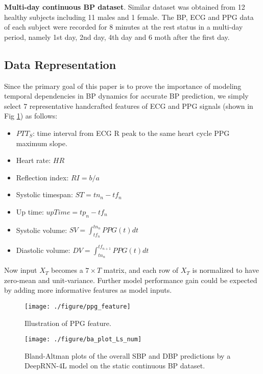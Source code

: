 \documentclass[letterpaper, 10 pt, conference]{ieeeconf}
\begin{document}
\textbf{Multi-day continuous BP dataset}.
Similar dataset was obtained from 12 healthy subjects including 11 males and 1 female.
The BP, ECG and PPG data of each subject were recorded for 8 minutes at the rest status in a multi-day period, namely 1st day, 2nd day, 4th day and 6 moth after the first day.


\subsection{Data Representation}
Since the primary goal of this paper is to prove the importance of modeling temporal dependencies in BP dynamics for accurate BP prediction, we simply select 7 representative handcrafted features of ECG and PPG signals (shown in Fig \ref{fig:PPG_feature}) as follows:
\begin{itemize}
\item $ PTT_S $: time interval from ECG R peak to the same heart cycle PPG maximum slope.
\item Heart rate: $ HR $
\item Reflection index: $ RI = b/a $ 
\item Systolic timespan: $ ST = tn_n - tf_n  $ 
\item Up time: $ upTime = tp_n - tf_n   $   
\item Systolic volume: $ SV = \int_{tf_n}^{tn_n} PPG(t) dt  $ 
\item Diastolic volume: $ DV = \int_{tn_n} ^ { tf_{n+1} } PPG(t) dt $ 
\end{itemize}

Now input $X_T$ becomes a $ 7 \times T$ matrix,
and each row of $X_T$ is normalized to have zero-mean and unit-variance. 
Further model performance gain could be expected by adding more informative features as model inputs.

\begin{figure}
\centering
\texttt{[image: ./figure/ppg\_feature]}
\caption{Illustration of PPG feature.}
\label{fig:PPG_feature}
\end{figure}

\begin{figure*}
\centering
\texttt{[image: ./figure/ba\_plot\_Ls\_num]}
\caption{Bland-Altman plots of the overall SBP and DBP predictions by a DeepRNN-4L model on the static continuous BP dataset.}
\label{fig:ba_plot}
\end{figure*}
\end{document}
